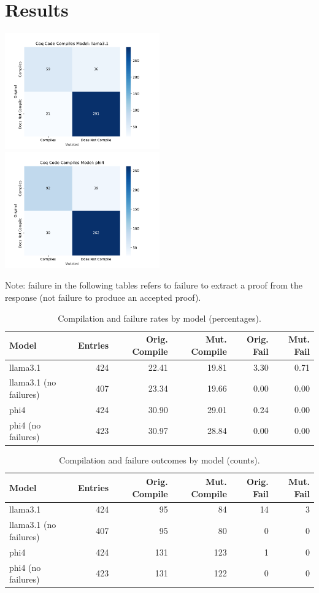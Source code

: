 \section{Results}
\label{sec:results}
\includegraphics[width=0.5\textwidth]{CM_Compiles_Model_llama3.1}
\includegraphics[width=0.5\textwidth]{CM_Compiles_Model_phi4}

Note: failure in the following tables refers to failure to extract a proof from the response (not failure to produce an accepted proof).

\begin{table}[h]
\centering
\begin{tabular}{|l|r|r|r|r|r|}
\hline
\textbf{Model} & \textbf{Entries} & \textbf{Orig. Compile} & \textbf{Mut. Compile} & \textbf{Orig. Fail} & \textbf{Mut. Fail} \\
\hline
llama3.1 & 424 & 22.41 & 19.81 & 3.30 & 0.71 \\
llama3.1 (no failures) & 407& 23.34 & 19.66 & 0.00 & 0.00 \\
phi4 & 424 & 30.90 & 29.01 & 0.24 & 0.00 \\
phi4 (no failures) & 423 & 30.97 & 28.84 & 0.00 & 0.00 \\
\hline
\end{tabular}
\caption{Compilation and failure rates by model (percentages).}
\label{tab:kpi-percentages}
\end{table}

\begin{table}[h]
\centering
\begin{tabular}{|l|r|r|r|r|r|}
\hline
\textbf{Model} & \textbf{Entries} & \textbf{Orig. Compile} & \textbf{Mut. Compile} & \textbf{Orig. Fail} & \textbf{Mut. Fail} \\
\hline
llama3.1 & 424 & 95 & 84 & 14 & 3 \\
llama3.1 (no failures) & 407 & 95 & 80 & 0 & 0 \\
phi4 & 424 & 131 & 123 & 1 & 0 \\
phi4 (no failures) & 423 & 131 & 122 & 0 & 0 \\
\hline
\end{tabular}
\caption{Compilation and failure outcomes by model (counts).}
\label{tab:kpi-counts}
\end{table}

